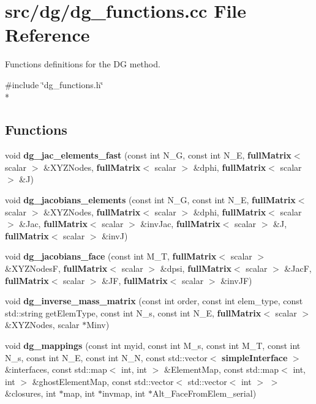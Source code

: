 \section{src/dg/dg\-\_\-functions.cc File Reference}
\label{dg__functions_8cc}


Functions definitions for the D\-G method.  


{\ttfamily \#include \char`\"{}dg\-\_\-functions.\-h\char`\"{}}\\*
\subsection*{Functions}
\begin{DoxyCompactItemize}
\item 
void {\bf dg\-\_\-jac\-\_\-elements\-\_\-fast} (const int N\-\_\-\-G, const int N\-\_\-\-E, {\bf full\-Matrix}$<$ scalar $>$ \&X\-Y\-Z\-Nodes, {\bf full\-Matrix}$<$ scalar $>$ \&dphi, {\bf full\-Matrix}$<$ scalar $>$ \&J)
\item 
void {\bf dg\-\_\-jacobians\-\_\-elements} (const int N\-\_\-\-G, const int N\-\_\-\-E, {\bf full\-Matrix}$<$ scalar $>$ \&X\-Y\-Z\-Nodes, {\bf full\-Matrix}$<$ scalar $>$ \&dphi, {\bf full\-Matrix}$<$ scalar $>$ \&Jac, {\bf full\-Matrix}$<$ scalar $>$ \&inv\-Jac, {\bf full\-Matrix}$<$ scalar $>$ \&J, {\bf full\-Matrix}$<$ scalar $>$ \&inv\-J)
\item 
void {\bf dg\-\_\-jacobians\-\_\-face} (const int M\-\_\-\-T, {\bf full\-Matrix}$<$ scalar $>$ \&X\-Y\-Z\-Nodes\-F, {\bf full\-Matrix}$<$ scalar $>$ \&dpsi, {\bf full\-Matrix}$<$ scalar $>$ \&Jac\-F, {\bf full\-Matrix}$<$ scalar $>$ \&J\-F, {\bf full\-Matrix}$<$ scalar $>$ \&inv\-J\-F)
\item 
void {\bf dg\-\_\-inverse\-\_\-mass\-\_\-matrix} (const int order, const int elem\-\_\-type, const std\-::string get\-Elem\-Type, const int N\-\_\-s, const int N\-\_\-\-E, {\bf full\-Matrix}$<$ scalar $>$ \&X\-Y\-Z\-Nodes, scalar $\ast$Minv)
\item 
void {\bf dg\-\_\-mappings} (const int myid, const int M\-\_\-s, const int M\-\_\-\-T, const int N\-\_\-s, const int N\-\_\-\-E, const int N\-\_\-\-N, const std\-::vector$<$ {\bf simple\-Interface} $>$ \&interfaces, const std\-::map$<$ int, int $>$ \&Element\-Map, const std\-::map$<$ int, int $>$ \&ghost\-Element\-Map, const std\-::vector$<$ std\-::vector$<$ int $>$ $>$ \&closures, int $\ast$map, int $\ast$invmap, int $\ast$Alt\-\_\-\-Face\-From\-Elem\-\_\-serial)
\end{DoxyCompactItemize}


